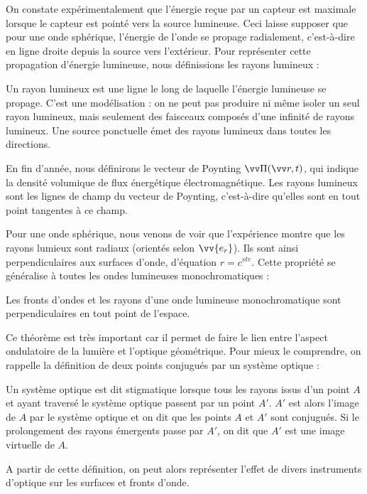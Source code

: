 \documentclass[11pt,fleqn]{book} %
\begin{document}
On constate expérimentalement que l'énergie reçue par un capteur est maximale lorsque le capteur est pointé vers la source lumineuse. Ceci laisse supposer que pour une onde sphérique, l'énergie de l'onde se propage radialement, c'est-à-dire en ligne droite depuis la source vers l'extérieur. Pour représenter cette propagation d'énergie lumineuse, nous définissions les rayons lumineux :
\begin{definition}
	Un rayon lumineux est une ligne le long de laquelle l'énergie lumineuse se propage. C’est une modélisation : on ne peut pas produire ni même isoler un seul rayon lumineux, mais seulement des faisceaux composés d’une infinité de rayons lumineux. Une source ponctuelle émet des rayons lumineux dans toutes les directions. 
\end{definition}
\begin{remark}
	En fin d'année, nous définirons le vecteur de Poynting $\vv \Pi(\vv r,t)$, qui indique la densité volumique de flux énergétique électromagnétique. Les rayons lumineux sont les lignes de champ du vecteur de Poynting, c'est-à-dire qu'elles sont en tout point tangentes à ce champ.
\end{remark}

Pour une onde sphérique, nous venons de voir que l'expérience montre que les rayons lumieux sont radiaux (orientés selon $\vv{e_r}$). Ils sont ainsi perpendiculaires aux surfaces d'onde, d'équation $r = c^{ste}$. Cette propriété se généralise à toutes les ondes lumineuses monochromatiques :
\begin{theorem}
Les fronts d'ondes et les rayons d'une onde lumineuse monochromatique sont perpendiculaires en tout point de l'espace.
\end{theorem}

Ce théorème est très important car il permet de faire le lien entre l'aspect ondulatoire de la lumière et l'optique géométrique. Pour mieux le comprendre, on rappelle la définition de deux points conjugués par un système optique :
\begin{definition}
Un système optique est dit stigmatique lorsque tous les rayons issus d'un point $A$ et ayant traversé le système optique passent par un point $A'$. $A'$ est alors l'image de $A$ par le système optique et on dit que les points $A$ et $A'$ sont conjugués. Si le prolongement des rayons émergents passe par $A'$, on dit que $A'$ est une image virtuelle de $A$.
\end{definition}
A partir de cette définition, on peut alors représenter l'effet de divers instruments d'optique sur les surfaces et fronts d'onde.
\end{document}
